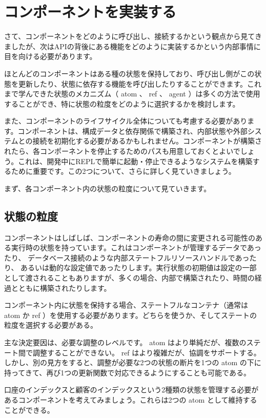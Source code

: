 \section{コンポーネントを実装する}

さて、コンポーネントをどのように呼び出し、接続するかという観点から見てきましたが、次はAPIの背後にある機能をどのように実装するかという内部事情に目を向ける必要があります。

ほとんどのコンポーネントはある種の状態を保持しており、呼び出し側がこの状態を更新したり、状態に依存する機能を呼び出したりすることができます。これまで学んできた状態のメカニズム（ atom 、 ref 、 agent ）は多くの方法で使用することができ、特に状態の粒度をどのように選択するかを検討します。

また、コンポーネントのライフサイクル全体についても考慮する必要があります。コンポーネントは、構成データと依存関係で構築され、内部状態や外部システムとの接続を初期化する必要があるかもしれません。コンポーネントが構築されたら、各コンポーネントを停止するためのパスも用意しておくとよいでしょう。これは、開発中にREPLで簡単に起動・停止できるようなシステムを構築するために重要です。この2つについて、さらに詳しく見ていきましょう。

まず、各コンポーネント内の状態の粒度について見ていきます。

\subsection{状態の粒度}

コンポーネントはしばしば、コンポーネントの寿命の間に変更される可能性のある実行時の状態を持っています。これはコンポーネントが管理するデータであったり、 データベース接続のような内部ステートフルリソースハンドルであったり、 あるいは動的な設定値であったりします。実行状態の初期値は設定の一部として渡されることもありますが、多くの場合、内部で構築されたり、時間の経過とともに構築されたりします。

コンポーネント内に状態を保持する場合、ステートフルなコンテナ（通常は atom か ref ）を使用する必要があります。どちらを使うか、そしてステートの粒度を選択する必要がある。

主な決定要因は、必要な調整のレベルです。 atom はより単純だが、複数のステート間で調整することができない。 ref はより複雑だが、協調をサポートする。しかし、別の見方をすると、調整が必要な2つの状態の断片を1つの atom の下に持ってきて、再び1つの更新関数で対応できるようにすることも可能である。

口座のインデックスと顧客のインデックスという2種類の状態を管理する必要があるコンポーネントを考えてみましょう。これらは2つの atom として維持することができる。

